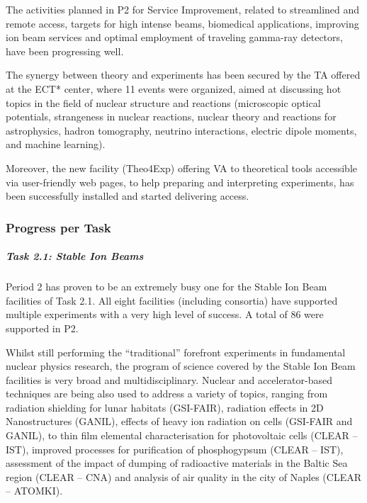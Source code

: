 The activities planned in P2 for Service Improvement, related to streamlined and remote access, targets for high intense beams, biomedical applications, improving ion beam services and optimal employment of traveling gamma-ray detectors, have been progressing well. 

The synergy between theory and experiments has been secured by the TA offered at the ECT* center, where 11 events were organized, aimed at 
discussing hot topics in the field of nuclear structure and reactions
(microscopic optical potentials, strangeness in nuclear reactions, nuclear theory and reactions for astrophysics, hadron tomography, neutrino interactions, electric dipole moments,  and machine learning). 

Moreover, the new facility (Theo4Exp) offering VA to theoretical tools accessible via user-friendly web pages, to help preparing and interpreting experiments, has been successfully installed and started delivering access.
\subsubsection*{Progress per Task}
\subparagraph{Task 2.1: Stable Ion Beams} \mbox{}


Period 2 has proven to be an extremely busy one for the Stable Ion Beam facilities of Task 2.1. All eight facilities (including consortia) have supported multiple experiments with a very high level of success. A total of 86 were supported in P2.

Whilst still performing the “traditional” forefront experiments in fundamental nuclear physics research, the program of science covered by the Stable Ion Beam facilities is very broad and multidisciplinary. Nuclear and accelerator-based techniques are being also used to address a variety of topics, 
ranging from radiation shielding for lunar habitats (GSI-FAIR), radiation effects in 2D Nanostructures (GANIL), effects of heavy ion radiation on cells (GSI-FAIR and GANIL), to thin film elemental characterisation for photovoltaic cells (CLEAR – IST), improved processes for purification of phosphogypsum (CLEAR – IST), assessment of the impact of dumping of radioactive materials in the Baltic Sea region (CLEAR – CNA) and analysis of air quality in the city of Naples (CLEAR – ATOMKI).

